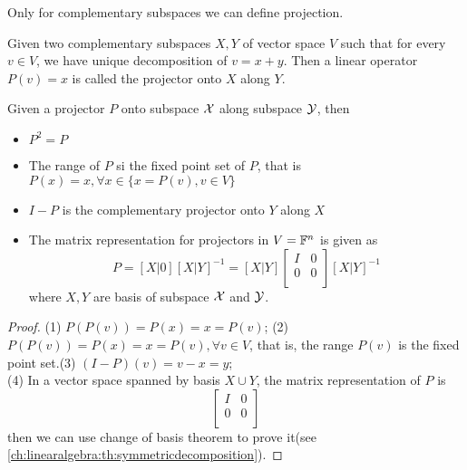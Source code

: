 \begin{refsection}
\begin{remark}
	Only for complementary subspaces we can define projection.
\end{remark}

\begin{definition}[projector]\cite[386]{meyer2000matrix}
	Given two complementary subspaces $X,Y$ of vector space $V$ such that for every $v\in V$, we have unique decomposition of $v=x + y$. Then a linear operator $P(v) = x$ is called the projector onto $X$ along $Y$.
\end{definition}


\begin{theorem}\cite[386]{meyer2000matrix}\label{ch:linearalgebra:th:projectorproperty}
	Given a projector $P$ onto subspace $\mathcal{X}$ along subspace $\mathcal{Y}$, then
	\begin{itemize}
		\item $P^2 = P$
		\item The range of $P$ si the fixed point set of $P$, that is $P(x) = x,\forall x\in \{x = P(v),v\in V\}$		
		\item $I-P$ is the complementary projector onto $Y$ along $X$
		
		\item The matrix representation for projectors in $V=\mathbb{F}^n$ is given as
		$$P = [X|0][X|Y]^{-1}  = [X|Y]\begin{bmatrix}
		I & 0 \\
		0 & 0 \\
		\end{bmatrix} [X|Y]^{-1}$$
		where $X,Y$ are basis of subspace $\mathcal{X}$ and $\mathcal{Y}$.		
	\end{itemize}
\end{theorem}
\begin{proof}
	(1) $P(P(v)) = P(x) = x = P(v)$; (2) $P(P(v)) = P(x) = x = P(v), \forall v\in V$, that is, the range $P(v)$ is the fixed point set.(3) $(I-P)(v) = v-x=y$; \\
	(4)  In a vector space spanned by basis $X\cup Y$, the matrix representation of $P$ is
	$$\begin{bmatrix}
	I & 0 \\
	0 & 0 \\
	\end{bmatrix}$$
	then we can use change of basis theorem to prove it(see \autoref{ch:linearalgebra:th:symmetricdecomposition}).
\end{proof}


\end{refsection}
